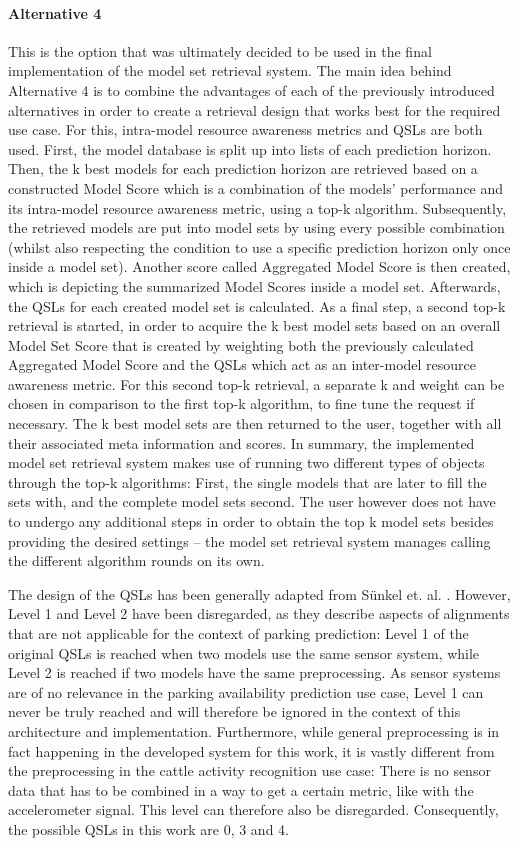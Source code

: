 \paragraph{Alternative 4}
This is the option that was ultimately decided to be used in the final implementation of the model set retrieval system. The main idea behind Alternative 4 is to combine the advantages of each of the previously introduced alternatives in order to create a retrieval design that works best for the required use case. For this, intra-model resource awareness metrics and QSLs are both used. First, the model database is split up into lists of each prediction horizon. Then, the k best models for each prediction horizon are retrieved based on a constructed Model Score which is a combination of the models’ performance and its intra-model resource awareness metric, using a top-k algorithm. Subsequently, the retrieved models are put into model sets by using every possible combination (whilst also respecting the condition to use a specific prediction horizon only once inside a model set). Another score called Aggregated Model Score is then created, which is depicting the summarized Model Scores inside a model set. Afterwards, the QSLs for each created model set is calculated. As a final step, a second top-k retrieval is started, in order to acquire the k best model sets based on an overall Model Set Score that is created by weighting both the previously calculated Aggregated Model Score and the QSLs which act as an inter-model resource awareness metric. For this second top-k retrieval, a separate k and weight can be chosen in comparison to the first top-k algorithm, to fine tune the request if necessary. The k best model sets are then returned to the user, together with all their associated meta information and scores. In summary, the implemented model set retrieval system makes use of running two different types of objects through the top-k algorithms: First, the single models that are later to fill the sets with, and the complete model sets second. The user however does not have to undergo any additional steps in order to obtain the top k model sets besides providing the desired settings – the model set retrieval system manages calling the different algorithm rounds on its own.

The design of the QSLs has been generally adapted from Sünkel et. al. \cite{sunkel2022}. However, Level 1 and Level 2 have been disregarded, as they describe aspects of alignments that are not applicable for the context of parking prediction: Level 1 of the original QSLs is reached when two models use the same sensor system, while Level 2 is reached if two models have the same preprocessing. As sensor systems are of no relevance in the parking availability prediction use case, Level 1 can never be truly reached and will therefore be ignored in the context of this architecture and implementation. Furthermore, while general preprocessing is in fact happening in the developed system for this work, it is vastly different from the preprocessing in the cattle activity recognition use case: There is no sensor data that has to be combined in a way to get a certain metric, like with the accelerometer signal. This level can therefore also be disregarded. Consequently, the possible QSLs in this work are 0, 3 and 4.


